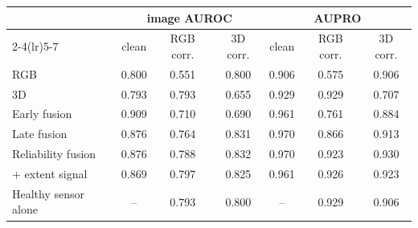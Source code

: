 \begin{tabular}{lcccccc}
\toprule
 & \multicolumn{3}{c}{image AUROC} & \multicolumn{3}{c}{AUPRO} \\
\cmidrule(lr){2-4}\cmidrule(lr){5-7}
 & clean & RGB corr. & 3D corr. & clean & RGB corr. & 3D corr. \\
\midrule
RGB & 0.800 & 0.551 & 0.800 & 0.906 & 0.575 & 0.906 \\
3D & 0.793 & 0.793 & 0.655 & 0.929 & 0.929 & 0.707 \\
Early fusion & 0.909 & 0.710 & 0.690 & 0.961 & 0.761 & 0.884 \\
Late fusion & 0.876 & 0.764 & 0.831 & 0.970 & 0.866 & 0.913 \\
Reliability fusion & 0.876 & 0.788 & 0.832 & 0.970 & 0.923 & 0.930 \\
\quad + extent signal & 0.869 & 0.797 & 0.825 & 0.961 & 0.926 & 0.923 \\
\midrule
Healthy sensor alone & -- & 0.793 & 0.800 & -- & 0.929 & 0.906 \\
\bottomrule
\end{tabular}
